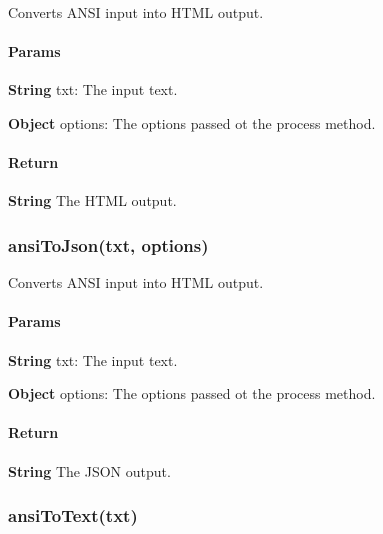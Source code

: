 Converts A\+N\+SI input into H\+T\+ML output. \paragraph*{Params}


\begin{DoxyItemize}
\item {\bfseries String} {\ttfamily txt}\+: The input text.
\item {\bfseries Object} {\ttfamily options}\+: The options passed ot the {\ttfamily process} method.
\end{DoxyItemize}

\paragraph*{Return}


\begin{DoxyItemize}
\item {\bfseries String} The H\+T\+ML output.
\end{DoxyItemize}

\subsubsection*{{\ttfamily ansi\+To\+Json(txt, options)}}

Converts A\+N\+SI input into H\+T\+ML output. \paragraph*{Params}


\begin{DoxyItemize}
\item {\bfseries String} {\ttfamily txt}\+: The input text.
\item {\bfseries Object} {\ttfamily options}\+: The options passed ot the {\ttfamily process} method.
\end{DoxyItemize}

\paragraph*{Return}


\begin{DoxyItemize}
\item {\bfseries String} The J\+S\+ON output.
\end{DoxyItemize}

\subsubsection*{{\ttfamily ansi\+To\+Text(txt)}}

